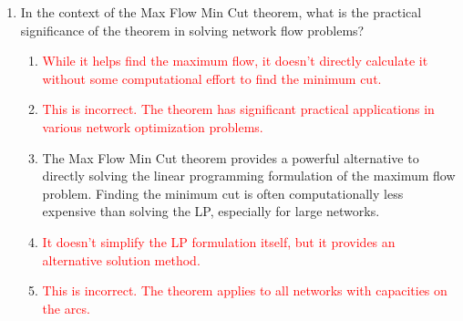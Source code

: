 \documentclass{article}%
\newcommand{\incorrect}[1]{\textcolor{red}{#1}}
\begin{document}
\begin{enumerate}
\item In the context of the Max Flow Min Cut theorem, what is the practical significance of the theorem in solving network flow problems?%
\begin{enumerate}%
\item \incorrect{While it helps find the maximum flow, it doesn't directly calculate it without some computational effort to find the minimum cut.}%
\item \incorrect{This is incorrect. The theorem has significant practical applications in various network optimization problems.}%
\item The Max Flow Min Cut theorem provides a powerful alternative to directly solving the linear programming formulation of the maximum flow problem. Finding the minimum cut is often computationally less expensive than solving the LP, especially for large networks.%
\item \incorrect{It doesn't simplify the LP formulation itself, but it provides an alternative solution method.}%
\item \incorrect{This is incorrect. The theorem applies to all networks with capacities on the arcs.}%
\end{enumerate}%
\vspace{1em}%
\end{enumerate}

%
\end{document}

